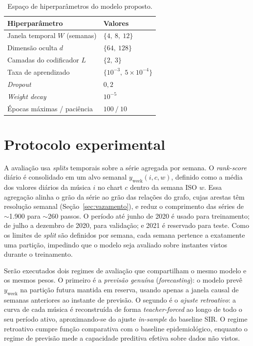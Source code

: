 \begin{table}[htbp]
\centering
\caption{Espaço de hiperparâmetros do modelo proposto.}
\label{tab:hparams}
\begin{tabular}{p{6.5cm}p{6.0cm}}
\hline
\textbf{Hiperparâmetro} & \textbf{Valores} \\
\hline
Janela temporal $W$ (semanas) & $\{4,\ 8,\ 12\}$ \\
Dimensão oculta $d$ & $\{64,\ 128\}$ \\
Camadas do codificador $L$ & $\{2,\ 3\}$ \\
Taxa de aprendizado & $\{10^{-3},\ 5\times10^{-4}\}$ \\
\emph{Dropout} & $0{,}2$ \\
\emph{Weight decay} & $10^{-5}$ \\
Épocas máximas / paciência & $100\ /\ 10$ \\
\hline
\end{tabular}
\end{table}


\section{Protocolo experimental}

A avaliação usa \emph{splits} temporais sobre a série agregada por semana. O \emph{rank-score} diário é consolidado em um alvo semanal $y_{\text{week}}(i, c, w)$, definido como a média dos valores diários da música $i$ no chart $c$ dentro da semana ISO $w$. Essa agregação alinha o grão da série ao grão das relações do grafo, cujas arestas têm resolução semanal (Seção~\ref{sec:vazamento}), e reduz o comprimento das séries de $\sim$1.900 para $\sim$260 passos. O período até junho de 2020 é usado para treinamento; de julho a dezembro de 2020, para validação; e 2021 é reservado para teste. Como os limites de \emph{split} são definidos por semana, cada semana pertence a exatamente uma partição, impedindo que o modelo seja avaliado sobre instantes vistos durante o treinamento.

Serão executados dois regimes de avaliação que compartilham o mesmo modelo e os mesmos pesos. O primeiro é a \emph{previsão genuína} (\emph{forecasting}): o modelo prevê $y_{\text{week}}$ na partição futura mantida em reserva, usando apenas a janela causal de semanas anteriores ao instante de previsão. O segundo é o \emph{ajuste retroativo}: a curva de cada música é reconstruída de forma \emph{teacher-forced} ao longo de todo o seu período ativo, aproximando-se do ajuste \emph{in-sample} do baseline SIR. O regime retroativo cumpre função comparativa com o baseline epidemiológico, enquanto o regime de previsão mede a capacidade preditiva efetiva sobre dados não vistos.


